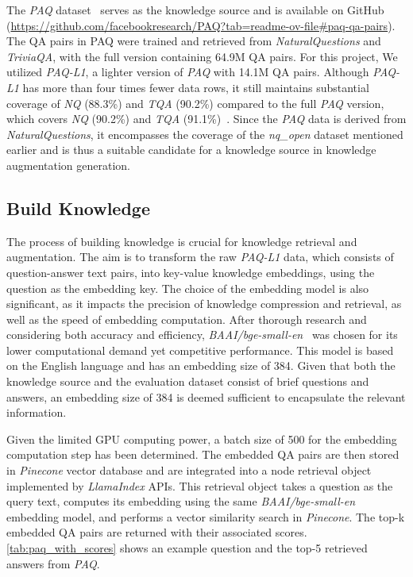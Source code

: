 The \emph{PAQ} dataset~\citep{paq} serves as the knowledge source and is available on GitHub (\url{https://github.com/facebookresearch/PAQ?tab=readme-ov-file#paq-qa-pairs}). The QA pairs in PAQ were trained and retrieved from \emph{NaturalQuestions} and \emph{TriviaQA}, with the full version containing 64.9M QA pairs. For this project, We utilized \emph{PAQ-L1}, a lighter version of \emph{PAQ} with 14.1M QA pairs. Although \emph{PAQ-L1} has more than four times fewer data rows, it still maintains substantial coverage of \emph{NQ} (88.3\%) and \emph{TQA} (90.2\%) compared to the full \emph{PAQ} version, which covers \emph{NQ} (90.2\%) and \emph{TQA} (91.1\%)~\citep{paq}. Since the \emph{PAQ} data is derived from \emph{NaturalQuestions}, it encompasses the coverage of the \emph{nq\_open} dataset mentioned earlier and is thus a suitable candidate for a knowledge source in knowledge augmentation generation.



\subsection{Build Knowledge}

The process of building knowledge is crucial for knowledge retrieval and augmentation. The aim is to transform the raw \emph{PAQ-L1} data, which consists of question-answer text pairs, into key-value knowledge embeddings, using the question as the embedding key. The choice of the embedding model is also significant, as it impacts the precision of knowledge compression and retrieval, as well as the speed of embedding computation. After thorough research and considering both accuracy and efficiency, \emph{BAAI/bge-small-en}~\cite{bge_embedding} was chosen for its lower computational demand yet competitive performance. This model is based on the English language and has an embedding size of 384. Given that both the knowledge source and the evaluation dataset consist of brief questions and answers, an embedding size of 384 is deemed sufficient to encapsulate the relevant information.

Given the limited GPU computing power, a batch size of 500 for the embedding computation step has been determined. The embedded QA pairs are then stored in \emph{Pinecone} vector database and are integrated into a node retrieval object implemented by \emph{LlamaIndex} APIs. This retrieval object takes a question as the query text, computes its embedding using the same \emph{BAAI/bge-small-en} embedding model, and performs a vector similarity search in \emph{Pinecone}. The top-k embedded QA pairs are returned with their associated scores. \cref{tab:paq_with_scores} shows an example question and the top-5 retrieved answers from \emph{PAQ}.

